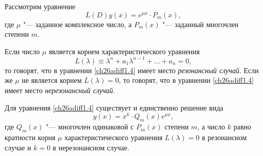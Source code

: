 Рассмотрим уравнение
\begin{equation}\label{ch26adiff1.4}
L(D)y(x)=e^{\mu x}\cdot P_m(x),
\end{equation}
где $\mu$ "--- заданное комплексное число, а $P_m(x)$ "--- заданный многочлен степени $m$.

\begin{defn}
Если число $\mu$ является корнем характеристического уравнения
$$
L(\lambda)\equiv \lambda^n+a_1\lambda^{n-1}+\dots+a_n=0,
$$
то говорят, что в уравнении \eqref{ch26adiff1.4} имеет место \textit{резонансный случай}. Если же $\mu$ не является корнем $L(\lambda)=0$, то говорят, что в уравнении \eqref{ch26adiff1.4} имеет место \textit{нерезонансный случай}.
\end{defn}

\begin{thm} 
Для уравнения \eqref{ch26adiff1.4} существует и единственно решение вида
$$
y(x)=x^k\cdot Q_m(x)e^{\mu x},
$$
где $Q_m(x)$ "--- многочлен одинаковой с $P_m(x)$ степени $m$, а число $k$ равно кратности корня $\mu$ характеристического уравнения $L(\lambda)=0$ в резонансном случае и $k=0$ в нерезонансном случае.
\end{thm}

